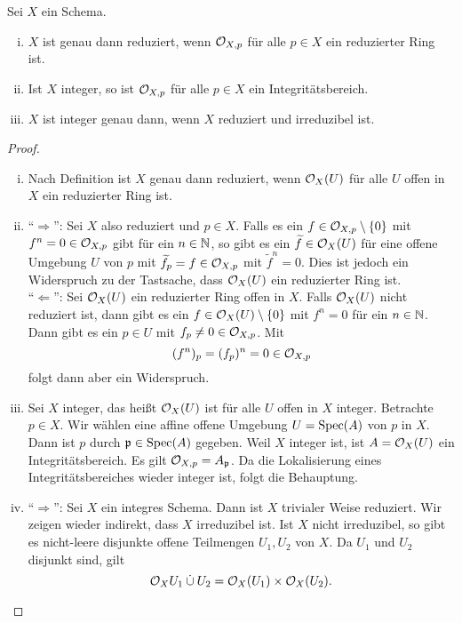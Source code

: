 \begin{prop}\label{prop:6.5}
	Sei $X$ ein Schema.
	\begin{enumerate}[i)]
		\item $X$ ist genau dann reduziert, wenn $\mathcal{O}_{X,p}$ für alle $p \in X$ ein reduzierter Ring ist.
		\item Ist $X$ integer, so ist $\mathcal{O}_{X,p}$ für alle $p \in X$ ein Integritätsbereich.
		\item $X$ ist integer genau dann, wenn $X$ reduziert und irreduzibel ist.
	\end{enumerate}
	\begin{proof}
		\begin{enumerate}[i)]
			\item Nach Definition ist $X$ genau dann reduziert, wenn $\mathcal{O}_X(U)$ für alle $U$ offen in $X$ ein reduzierter Ring ist.
			\item \enquote{$\Longrightarrow$}: Sei $X$ also reduziert und $p \in X$. Falls es ein $f \in \mathcal{O}_{X,p}\setminus\{0\}$ mit $f^n=0 \in \mathcal{O}_{X,p}$ gibt für ein $n \in \mathbb {N}$, so gibt es ein $\widetilde{f}\in \mathcal{O}_{X}(U)$ für eine offene Umgebung $U$ von $p$ mit $\widetilde{f}_p=f \in \mathcal{O}_{X,p}$ mit $\widetilde{f}^n = 0$. Dies ist jedoch ein Widerspruch zu der Tastsache, dass $\mathcal{O}_{X}(U)$ ein reduzierter Ring ist.\\
			\enquote{$\Longleftarrow$}: Sei $\mathcal{O}_X(U)$ ein reduzierter Ring
			offen in $X$. Falls $\mathcal{O}_X(U)$ nicht reduziert ist, dann gibt es ein $f \in \mathcal{O}_X(U)\setminus\{0\}$ mit $f^n = 0$ für ein $n \in \mathbb {N}$. Dann gibt es ein $p \in U$ mit $f_p \neq 0 \in \mathcal{O}_{X,p}$. Mit
			\[
				(f^n)_p = (f_p)^n=0 \in \mathcal{O}_{X,p}
			\]
			folgt dann aber ein Widerspruch.
			\item Sei $X$ integer, das heißt $\mathcal{O}_X(U)$ ist für alle $U$ offen in $X$ integer. Betrachte $p \in X$. Wir wählen eine affine offene Umgebung $U = \operatorname{Spec}(A)$ von $p$ in $X$. Dann ist $p$ durch $\mathfrak{p} \in \operatorname{Spec}(A)$ gegeben. Weil $X$ integer ist, ist $A = \mathcal{O}_X(U)$ ein Integritätsbereich. Es gilt $\mathcal{O}_{X,p} = A_{\mathfrak{p}}$. Da die Lokalisierung eines Integritätsbereiches wieder integer ist, folgt die Behauptung.
			\item \enquote{$\Longrightarrow$}: Sei $X$ ein integres Schema. Dann ist $X$ trivialer Weise reduziert. Wir zeigen wieder indirekt, dass $X$ irreduzibel ist. Ist $X$ nicht irreduzibel, so gibt es nicht-leere disjunkte offene Teilmengen $U_1,U_2$ von $X$. Da $U_1$ und $U_2$ disjunkt sind, gilt
			\[
				\mathcal{O}_X{U_1 \mathbin{\dot{\cup}} U_2} = \mathcal{O}_{X}(U_1) \times \mathcal{O}_{X}(U_2).
			\]

\end{enumerate}
\end{proof}
\end{prop}
